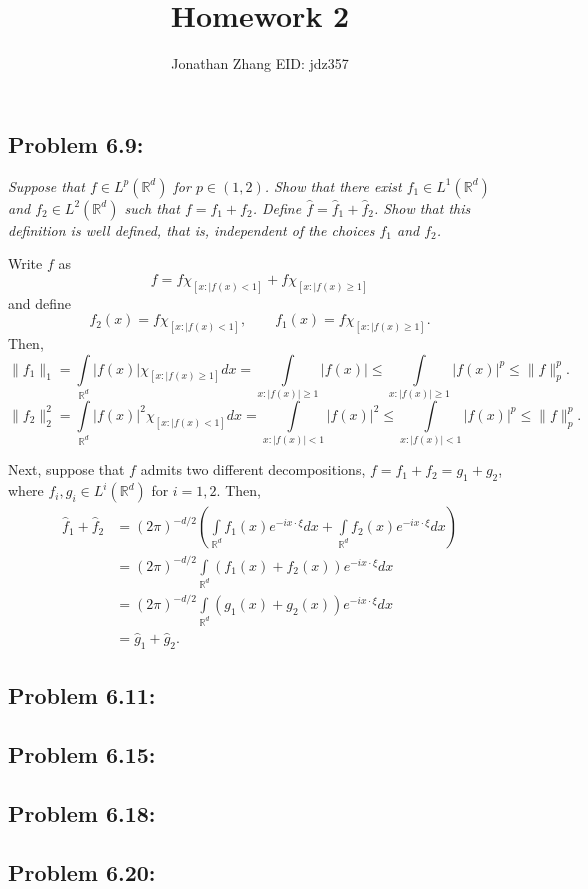 \documentclass[letterpaper,twoside,11pt]{article}
\theoremstyle{mystyle}
\newcommand{\R}{{\mathbb R}}
\begin{document}
\title{\vspace{-2\baselineskip} 
Homework 2
}
\author{Jonathan Zhang \qquad EID: { jdz357} }
\date{}
\maketitle


\subsection*{Problem 6.9:}
\textit{
Suppose that $f\in L^p\left( \R^d \right)$ for $p \in \left( 1, 2 \right)$. Show that there exist $f_1 \in L^1\left( \R^d \right)$ and $f_2 \in L^2\left( \R^d \right)$ such that $f = f_1 + f_2$. 
Define $\hat f = \hat f_1 + \hat f_2$. Show that this definition is well defined, that is, independent of the choices $f_1$ and $f_2$. }

Write $f$ as 
\[f = f\chi_{[x:|f(x)<1]} + f\chi_{[x:|f(x)\geqslant 1]}\]
and define 
\[f_2(x) = f\chi_{[x:|f(x)<1]},\qquad f_1(x) = f\chi_{[x:|f(x)\geqslant 1]}.\]
Then, 
\[\|f_1\|_1 = \int\limits_{\R^d} |f(x)|\chi_{[x:|f(x)\geqslant 1]}dx = \int\limits_{x:|f(x)|\geqslant 1}|f(x)| \leq\int\limits_{x:|f(x)|\geqslant 1}|f(x)|^p \leq \|f\|_p^p. \]
\[\|f_2\|_2^2 = \int\limits_{\R^d} |f(x)|^2\chi_{[x:|f(x)< 1]}dx = \int\limits_{x:|f(x)|< 1}|f(x)|^2 \leq\int\limits_{x:|f(x)|< 1}|f(x)|^p \leq \|f\|_p^p. \]

Next, suppose that $f$ admits two different decompositions, $f = f_1 + f_2 = g_1 + g_2$, where $f_i, g_i \in L^i\left( \R^d \right)$ for $i = 1, 2$. Then, 
\begin{align*}
\hat f_1 + \hat f_2 &= \left( 2\pi \right)^{-d/2}\left(\int\limits_{\R^d} f_1(x) e^{-ix\cdot \xi } dx+\int\limits_{\R^d} f_2(x) e^{-ix\cdot \xi } dx \right)\\
&=\left( 2\pi \right)^{-d/2} \int\limits_{\R^d} \left( f_1(x) + f_2(x)  \right)e^{-ix\cdot \xi }dx\\
&=\left( 2\pi \right)^{-d/2} \int\limits_{\R^d} \left( g_1(x) + g_2(x)  \right)e^{-ix\cdot \xi }dx\\
&=\hat g_1 + \hat g_2.
\end{align*}


\subsection*{Problem 6.11:}

\subsection*{Problem 6.15:}






\subsection*{Problem 6.18:}





\subsection*{Problem 6.20:}
\end{document}

